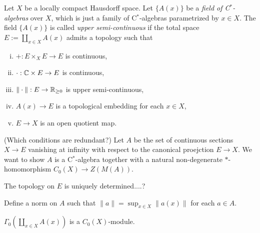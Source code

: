 \documentclass{../../large}
\begin{document}
\begin{prb}
Let $X$ be a locally compact Hausdorff space.
Let $\{A(x)\}$ be a \emph{field of C$^*$-algebras} over $X$, which is just a family of C$^*$-algebras parametrized by $x\in X$.
The field $\{A(x)\}$ is called \emph{upper semi-continuous} if the total space $E:=\coprod_{x\in X}A(x)$ admits a topology such that
\begin{enumerate}[(i)]
\item $+:E\times_XE\to E$ is continuous,
\item $\cdot:\mathbb{C}\times E\to E$ is continuous,
\item $\|\cdot\|:E\to\mathbb{R}_{\ge0}$ is upper semi-continuous,
\item $A(x)\to E$ is a topological embedding for each $x\in X$,
\item $E\to X$ is an open quotient map.
\end{enumerate}
(Which conditions are redundant?)
Let $A$ be the set of continuous sections $X\to E$ vanishing at infinity with respect to the canonical proejction $E\to X$.
We want to show $A$ is a C$^*$-algebra together with a natural non-degenerate $*$-homomorphism $C_0(X)\to Z(M(A))$.
\begin{parts}
\item The topology on $E$ is uniquely determined....?
\end{parts}
\end{prb}
\begin{pf}


Define a norm on $A$ such that $\|a\|=\sup_{x\in X}\|a(x)\|$ for each $a\in A$.


$\Gamma_0(\coprod_{x\in X}A(x))$ is a $C_0(X)$-module.
\end{pf}
\end{document}
